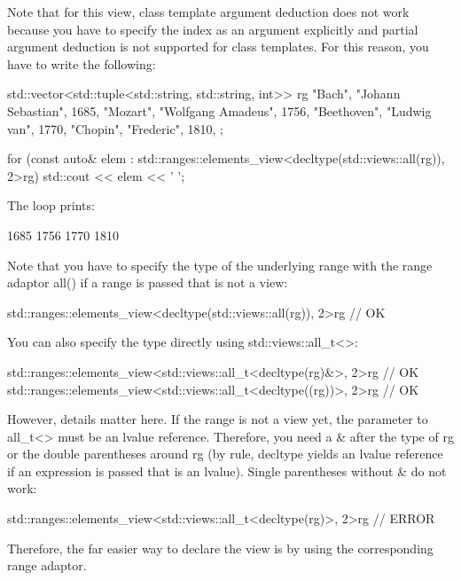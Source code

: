 Note that for this view, class template argument deduction does not work because you have to specify the index as an argument explicitly and partial argument deduction is not supported for class templates. For this reason, you have to write the following:

\begin{cpp}
std::vector<std::tuple<std::string, std::string, int>> rg{
	{"Bach", "Johann Sebastian", 1685}, {"Mozart", "Wolfgang Amadeus", 1756},
	{"Beethoven", "Ludwig van", 1770}, {"Chopin", "Frederic", 1810},
};

for (const auto& elem
	: std::ranges::elements_view<decltype(std::views::all(rg)), 2>{rg}) {
	std::cout << elem << ' ';
}
\end{cpp}

The loop prints:

\begin{shell}
1685 1756 1770 1810
\end{shell}

Note that you have to specify the type of the underlying range with the range adaptor all() if a range is passed that is not a view:

\begin{cpp}
std::ranges::elements_view<decltype(std::views::all(rg)), 2>{rg} // OK
\end{cpp}

You can also specify the type directly using std::views::all\_t<>:

\begin{cpp}
std::ranges::elements_view<std::views::all_t<decltype(rg)&>, 2>{rg} // OK
std::ranges::elements_view<std::views::all_t<decltype((rg))>, 2>{rg} // OK
\end{cpp}

However, details matter here. If the range is not a view yet, the parameter to all\_t<> must be an lvalue reference. Therefore, you need a \& after the type of rg or the double parentheses around rg (by rule, decltype yields an lvalue reference if an expression is passed that is an lvalue). Single parentheses without \& do not work:

\begin{cpp}
std::ranges::elements_view<std::views::all_t<decltype(rg)>, 2>{rg} // ERROR
\end{cpp}

Therefore, the far easier way to declare the view is by using the corresponding range adaptor.


